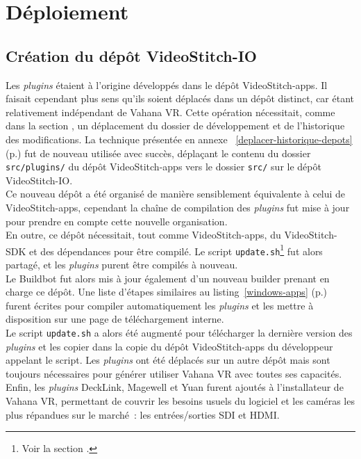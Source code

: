 \section{Déploiement}
\subsection{Création du dépôt VideoStitch-IO}
Les \textit{plugins} étaient à l'origine développés dans le dépôt VideoStitch-apps. Il faisait
cependant plus sens qu'ils soient déplacés dans un dépôt distinct, car étant relativement indépendant
de Vahana VR. Cette opération nécessitait, comme dans la section , un déplacement du dossier
de développement et de l'historique des modifications. La technique présentée en annexe~
\ref{deplacer-historique-depots} (p.\pageref{deplacer-historique-depots}) fut de
nouveau utilisée avec succès, déplaçant le contenu du dossier \texttt{src/plugins/}
du dépôt VideoStitch-apps vers le dossier \texttt{src/} sur le dépôt VideoStitch-IO.\\
\newline
Ce nouveau dépôt a été organisé de manière sensiblement équivalente à celui de VideoStitch-apps, 
cependant la chaîne de compilation des \textit{plugins} fut mise à jour pour prendre en compte
cette nouvelle organisation.\\
En outre, ce dépôt nécessitait, tout comme VideoStitch-apps, du VideoStitch-SDK et des dépendances
pour être compilé. Le script \texttt{update.sh}\footnote{Voir la section .}
fut alors partagé, et les \textit{plugins} purent être compilés à nouveau.\\
\newline
Le Buildbot fut alors mis à jour également d'un nouveau builder prenant en charge ce dépôt.
Une liste d'étapes similaires au listing~\ref{windows-apps} (p.\pageref{windows-apps}) furent écrites pour
compiler automatiquement les \textit{plugins} et les mettre à disposition sur une page de 
téléchargement interne.\\
Le script \texttt{update.sh} a alors été augmenté pour télécharger
la dernière version des \textit{plugins} et les copier dans la copie du dépôt VideoStitch-apps
du développeur appelant le script. Les \textit{plugins} ont été déplacés sur un autre dépôt
mais sont toujours nécessaires pour générer utiliser Vahana VR avec toutes ses
capacités.\\
Enfin, les \textit{plugins} DeckLink, Magewell et Yuan furent ajoutés à l'installateur de Vahana VR, 
permettant de couvrir les besoins usuels du logiciel et les caméras les plus répandues
sur le marché~: les entrées/sorties SDI et HDMI.

